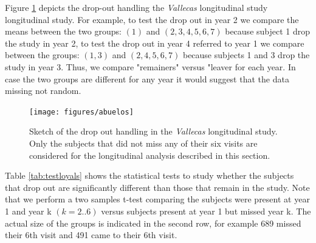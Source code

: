\documentclass[11pt]{article}
\theoremstyle{definition}
\theoremstyle{remark}
\begin{document}
Figure \ref{fig:abuelos} depicts the drop-out handling the \emph{Vallecas} longitudinal study longitudinal study. For example, to test the drop out in year 2 we compare the means between the two groups: $(1)$ and $(2,3,4,5,6,7)$ because subject 1 drop the study in year 2, to test the drop out in year 4 referred to year 1 we compare between the groups: $(1,3)$ and $(2,4,5,6,7)$ because subjects 1 and 3 drop the study in year 3. Thus, we compare  "remainers" versus "leaver for each year. In case the two groups are different for any year it would suggest that the data missing not random. 

\begin{figure}[H]
        \centering
        \texttt{[image: figures/abuelos]}
        \caption{Sketch of the drop out handling in the \emph{Vallecas} longitudinal study. Only the subjects that did not miss any of their six visits are considered for the longitudinal analysis described in this section.} 
        \label{fig:abuelos}
\end{figure}

Table \ref{tab:testloyals} shows the statistical tests to study whether the subjects that drop out are significantly different than those that remain in the study. %
Note that we perform a two samples t-test comparing the subjects were present at year 1 and year k $(k=2..6)$ versus subjects present at year 1 but missed year k. The actual size of the groups is indicated in the second row, for example 689 missed their 6th visit and 491 came to their 6th visit. 
\end{document}
